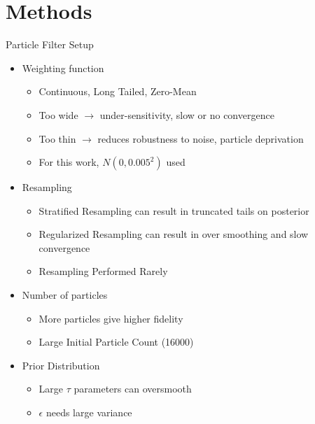 \section{Methods}
\begin{frame}{Particle Filter Setup}
\begin{itemize}
    \item Weighting function
        \begin{itemize}
            \item Continuous, Long Tailed, Zero-Mean 
            \item Too wide $\rightarrow$ under-sensitivity, 
                slow or no convergence
            \item Too thin $\rightarrow$ reduces robustness 
                to noise, particle deprivation
            \item For this work, $N(0, 0.005^2)$ used
        \end{itemize}
    \item Resampling 
        \begin{itemize}
            \item Stratified Resampling can result in truncated tails 
                    on posterior
            \item Regularized Resampling can result in over smoothing and 
                    slow convergence
            \item Resampling Performed Rarely
        \end{itemize}
    \item Number of particles
        \begin{itemize}
            \item More particles give higher fidelity 
            \item Large Initial Particle Count (16000)
        \end{itemize}
    \item Prior Distribution
    \begin{itemize}
            \item Large $\tau$ parameters can oversmooth
            \item $\epsilon$ needs large variance
    \end{itemize}
\end{itemize}
\end{frame}

